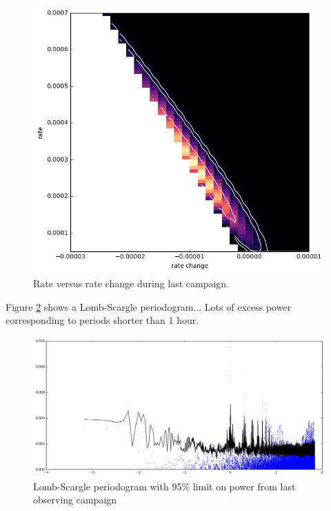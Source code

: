 \documentclass{emulateapj}
\begin{document}
\begin{figure}[htb]
\begin{center}
\includegraphics[width=0.9\columnwidth]{event_rate_contours}
\caption{Rate versus rate change during last campaign.
\label{fig:rate}}
\end{center}
\end{figure}

Figure \ref{fig:ls} shows a Lomb-Scargle periodogram...
Lots of excess power corresponding to periods shorter than 1 hour.

\begin{figure}[htb]
\begin{center}
\includegraphics[width=0.9\columnwidth]{lombscargle}
\caption{Lomb-Scargle periodogram with 95\% limit on power from last observing campaign
\label{fig:ls}}
\end{center}
\end{figure}
\end{document}

